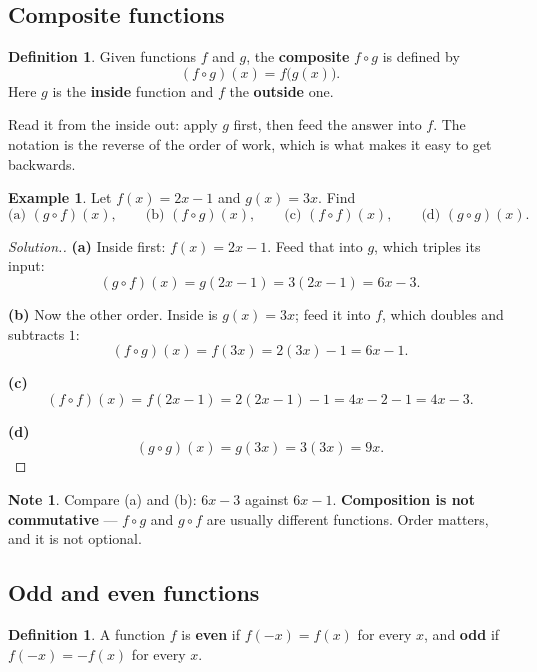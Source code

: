 \documentclass[11pt,a4paper]{article}
\theoremstyle{definition}
\newtheorem{definition}[thm]{Definition}
\newtheorem{example}[thm]{Example}
\newtheorem{note}[thm]{Note}
\newenvironment{solution}
  {\renewcommand{\qedsymbol}{}\begin{proof}[\textit{Solution}.]}
  {\end{proof}}
\begin{document}
\subsection{Composite functions}

\begin{definition}
Given functions $f$ and $g$, the \textbf{composite} $f\circ g$ is defined by
$$(f\circ g)(x)=f\big(g(x)\big).$$
Here $g$ is the \textbf{inside} function and $f$ the \textbf{outside} one.
\end{definition}

Read it from the inside out: apply $g$ first, then feed the answer into $f$. The
notation is the reverse of the order of work, which is what makes it easy to get
backwards.

\begin{example}
Let $f(x)=2x-1$ and $g(x)=3x$. Find
$$\text{(a) } (g\circ f)(x),\qquad \text{(b) } (f\circ g)(x),
\qquad \text{(c) } (f\circ f)(x),\qquad \text{(d) } (g\circ g)(x).$$
\end{example}

\begin{solution}
\textbf{(a)} Inside first: $f(x)=2x-1$. Feed that into $g$, which triples its input:
$$(g\circ f)(x)=g(2x-1)=3(2x-1)=6x-3.$$

\textbf{(b)} Now the other order. Inside is $g(x)=3x$; feed it into $f$, which doubles
and subtracts $1$:
$$(f\circ g)(x)=f(3x)=2(3x)-1=6x-1.$$

\textbf{(c)} $$(f\circ f)(x)=f(2x-1)=2(2x-1)-1=4x-2-1=4x-3.$$

\textbf{(d)} $$(g\circ g)(x)=g(3x)=3(3x)=9x.$$
\end{solution}

\begin{note}
Compare (a) and (b): $6x-3$ against $6x-1$. \textbf{Composition is not commutative} ---
$f\circ g$ and $g\circ f$ are usually different functions. Order matters, and it is not
optional.
\end{note}

\subsection{Odd and even functions}

\begin{definition}
A function $f$ is \textbf{even} if $f(-x)=f(x)$ for every $x$, and \textbf{odd} if
$f(-x)=-f(x)$ for every $x$.
\end{definition}
\end{document}

